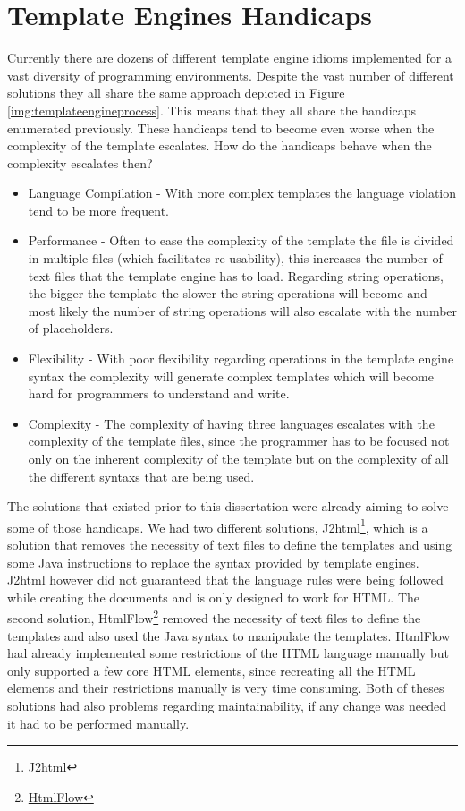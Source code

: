 \section{Template Engines Handicaps}
\label{sec:usecase}

\noindent
Currently there are dozens of different template engine idioms implemented for a vast diversity of programming environments. Despite the vast number of different solutions they all share the same approach depicted in Figure \ref{img:templateengineprocess}. This means that they all share the handicaps enumerated previously. These handicaps tend to become even worse when the complexity of the template escalates. How do the handicaps behave when the complexity escalates then?

\begin{itemize}
	\item Language Compilation - With more complex templates the language violation tend to be more frequent.
	\item Performance - Often to ease the complexity of the template the file is divided in multiple files (which facilitates re usability), this increases the number of text files that the template engine has to load. Regarding string operations, the bigger the template the slower the string operations will become and most likely the number of string operations will also escalate with the number of placeholders.
	\item Flexibility - With poor flexibility regarding operations in the template engine syntax the complexity will generate complex templates which will become hard for programmers to understand and write.
	\item Complexity - The complexity of having three languages escalates with the complexity of the template files, since the programmer has to be focused not only on the inherent complexity of the template but on the complexity of all the different syntaxs that are being used.
\end{itemize}

\noindent
The solutions that existed prior to this dissertation were already aiming to solve some of those handicaps. We had two different solutions, J2html\footnote{\href{https://j2html.com/}{J2html}}, which is a solution that removes the necessity of text files to define the templates and using some Java instructions to replace the syntax provided by template engines. J2html however did not guaranteed that the language rules were being followed while creating the documents and is only designed to work for \ac{HTML}. The second solution, HtmlFlow\footnote{\href{https://github.com/xmlet/HtmlFlow}{HtmlFlow}} removed the necessity of text files to define the templates and also used the Java syntax to manipulate the templates. HtmlFlow had already implemented some restrictions of the \ac{HTML} language manually but only supported a few core \ac{HTML} elements, since recreating all the \ac{HTML} elements and their restrictions manually is very time consuming. Both of theses solutions had also problems regarding maintainability, if any change was needed it had to be performed manually. 

